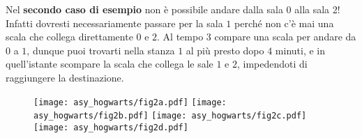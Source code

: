 Nel \textbf{secondo caso di esempio} non è possibile andare dalla sala 0 alla sala 2! Infatti dovresti necessariamente passare per la sala $1$ perché non c'è mai una scala che collega direttamente $0$ e $2$. Al tempo $3$ compare una scala per andare da $0$ a $1$, dunque puoi trovarti nella stanza $1$ al più presto dopo $4$ minuti, e in quell'istante scompare la scala che collega le sale $1$ e $2$, impedendoti di raggiungere la destinazione.

\begin{figure}[!h]
	\centering
	\texttt{[image: asy\_hogwarts/fig2a.pdf]}
	\texttt{[image: asy\_hogwarts/fig2b.pdf]}
	\texttt{[image: asy\_hogwarts/fig2c.pdf]}
	\texttt{[image: asy\_hogwarts/fig2d.pdf]}
\end{figure}

\begin{solution}
	
\end{solution}

